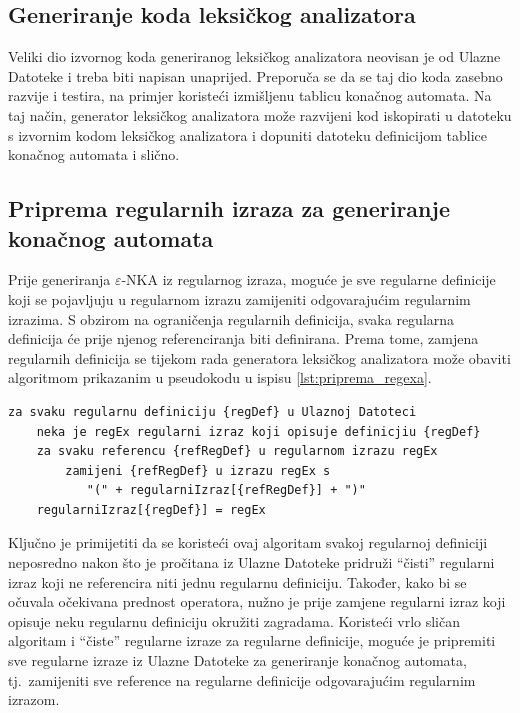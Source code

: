 \documentclass[times, 12pt, utf8]{book}
\begin{document}
\subsection{Generiranje koda leksičkog analizatora}
Veliki dio izvornog koda generiranog leksičkog analizatora neovisan je od Ulazne Datoteke i treba biti napisan unaprijed.
Preporuča se da se taj dio koda zasebno razvije i testira, na primjer koristeći izmišljenu tablicu konačnog automata.
Na taj način, generator leksičkog analizatora može razvijeni kod iskopirati u datoteku s izvornim kodom leksičkog analizatora i dopuniti datoteku definicijom tablice konačnog automata i slično.

\subsection{Priprema regularnih izraza za generiranje konačnog automata}
Prije generiranja \(\varepsilon\)-NKA iz regularnog izraza, moguće je sve regularne definicije koji se pojavljuju u regularnom izrazu zamijeniti odgovarajućim regularnim izrazima.
S obzirom na ograničenja regularnih definicija, svaka regularna definicija će prije njenog referenciranja biti definirana.
Prema tome, zamjena regularnih definicija se tijekom rada generatora leksičkog analizatora može obaviti algoritmom prikazanim u pseudokodu u ispisu \ref{lst:priprema_regexa}.

\begin{lstlisting}[caption={Pseudokod za pripremu regularnih izraza za generiranje konačnog automata.},label=lst:priprema_regexa]
za svaku regularnu definiciju {regDef} u Ulaznoj Datoteci
	neka je regEx regularni izraz koji opisuje definicjiu {regDef}
	za svaku referencu {refRegDef} u regularnom izrazu regEx
		zamijeni {refRegDef} u izrazu regEx s
           "(" + regularniIzraz[{refRegDef}] + ")"
	regularniIzraz[{regDef}] = regEx
\end{lstlisting}

Ključno je primijetiti da se koristeći ovaj algoritam svakoj regularnoj definiciji neposredno nakon što je pročitana iz Ulazne Datoteke pridruži ``čisti'' regularni izraz koji ne referencira niti jednu regularnu definiciju.
Također, kako bi se očuvala očekivana prednost operatora, nužno je prije zamjene regularni izraz koji opisuje neku regularnu definiciju okružiti zagradama.
Koristeći vrlo sličan algoritam i ``čiste'' regularne izraze za regularne definicije, moguće je pripremiti sve regularne izraze iz Ulazne Datoteke za generiranje konačnog automata, tj.~zamijeniti sve reference na regularne definicije odgovarajućim regularnim izrazom.
\end{document}
